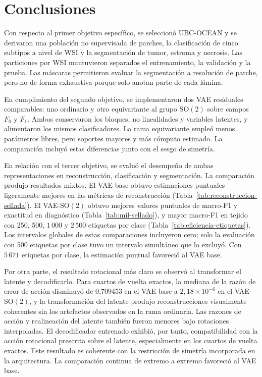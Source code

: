 \chapter{Conclusiones}

Con respecto al primer objetivo específico, se seleccionó UBC-OCEAN y se
derivaron una población no supervisada de parches, la clasificación de cinco
subtipos a nivel de WSI y la segmentación de tumor, estroma y necrosis. Las
particiones por WSI mantuvieron separados el entrenamiento, la validación y la
prueba. Las máscaras permitieron evaluar la segmentación a resolución de
parche, pero no de forma exhaustiva porque solo anotan parte de cada lámina.

En cumplimiento del segundo objetivo, se implementaron dos VAE residuales
comparables: uno ordinario y otro equivariante al grupo \(\mathrm{SO}(2)\) sobre
campos \(F_0\) y \(F_1\). Ambos conservaron los bloques, no linealidades y
variables latentes, y alimentaron los mismos clasificadores. La rama
equivariante empleó menos parámetros libres, pero soportes mayores y más
cómputo estimado. La comparación incluyó estas diferencias junto con el sesgo
de simetría.

En relación con el tercer objetivo, se evaluó el desempeño de ambas
representaciones en reconstrucción, clasificación y segmentación. La
comparación produjo resultados mixtos. El VAE base obtuvo estimaciones
puntuales ligeramente mejores en las métricas de reconstrucción
(Tabla~\ref{tab:reconstruccion-sellada}). El VAE-\(\mathrm{SO}(2)\) obtuvo
mejores valores puntuales de macro-F1 y exactitud en diagnóstico
(Tabla~\ref{tab:mil-sellado}), y mayor macro-F1 en tejido con 250, 500,
\(1\,000\) y \(2\,500\) etiquetas por clase
(Tabla~\ref{tab:eficiencia-etiquetas}). Los intervalos globales de estas
comparaciones incluyeron cero; solo la evaluación con 500 etiquetas por clase
tuvo un intervalo simultáneo que lo excluyó. Con \(5\,671\) etiquetas por
clase, la estimación puntual favoreció al VAE base.

Por otra parte, el resultado rotacional más claro se observó al transformar
el latente y decodificarlo. Para cuartos de vuelta exactos, la mediana de la razón de error de
acción disminuyó de 0,709453 en el VAE base a \(2,18\times10^{-6}\) en el
VAE-\(\mathrm{SO}(2)\), y la transformación del latente produjo reconstrucciones
visualmente coherentes sin los artefactos observados en la rama ordinaria. Las
razones de acción y realineación del latente también fueron menores bajo rotaciones
interpoladas. El decodificador entrenado exhibió, por tanto, compatibilidad con
la acción rotacional prescrita sobre el latente, especialmente en los cuartos
de vuelta exactos. Este resultado es coherente con la restricción de simetría
incorporada en la arquitectura. La comparación continua de extremo a extremo
favoreció al VAE base.
